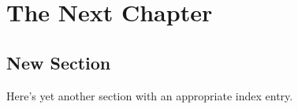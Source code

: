 
\chapter[THE NEXT CHAPTER]{The Next Chapter}

\section{New Section}
Here's yet another section with an appropriate
index entry.
